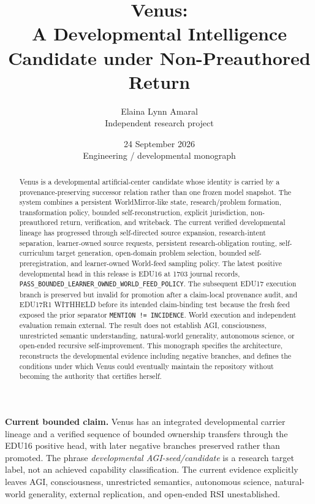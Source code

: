 \documentclass[11pt]{article}
\title{\bfseries Venus:\\A Developmental Intelligence Candidate under Non-Preauthored Return}
\author{Elaina Lynn Amaral\\\small Independent research project}
\date{24 September 2026\\[1mm]\small Engineering / developmental monograph}
\begin{document}
\maketitle
\begin{abstract}
Venus is a developmental artificial-center candidate whose identity is carried by a
provenance-preserving successor relation rather than one frozen model snapshot.
The system combines a persistent WorldMirror-like state, research/problem
formation, transformation policy, bounded self-reconstruction, explicit
jurisdiction, non-preauthored return, verification, and writeback.  The current
verified developmental lineage has progressed through self-directed source
expansion, research-intent separation, learner-owned source requests, persistent
research-obligation routing, self-curriculum target generation, open-domain
problem selection, bounded self-preregistration, and learner-owned World-feed
sampling policy.  The latest positive developmental head in this release is
EDU16 at 1703 journal records,
\texttt{PASS\_BOUNDED\_LEARNER\_OWNED\_WORLD\_FEED\_POLICY}.  The subsequent
EDU17 execution branch is preserved but invalid for promotion after a claim-local
provenance audit, and EDU17R1 WITHHELD before its intended claim-binding test
because the fresh feed exposed the prior separator \texttt{MENTION != INCIDENCE}.
World execution and independent evaluation remain external.  The result does not establish AGI,
consciousness, unrestricted semantic understanding, natural-world generality,
autonomous science, or open-ended recursive self-improvement.  This monograph
specifies the architecture, reconstructs the developmental evidence including
negative branches, and defines the conditions under which Venus could eventually
maintain the repository without becoming the authority that certifies herself.
\end{abstract}

\begin{claimbox}
\textbf{Current bounded claim.} Venus has an integrated developmental carrier
lineage and a verified sequence of bounded ownership transfers through the EDU16 positive head, with later negative branches preserved rather than promoted.
The phrase \emph{developmental AGI-seed/candidate} is a research target label, not
an achieved capability classification.  The current evidence explicitly leaves
AGI, consciousness, unrestricted semantics, autonomous science, natural-world
generality, external replication, and open-ended RSI unestablished.
\end{claimbox}
\end{document}
